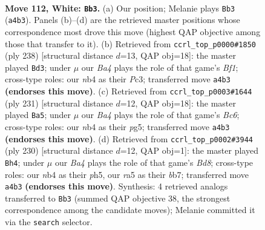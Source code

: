 \documentclass[11pt]{article}
\begin{document}
\clearpage

\begin{figure}[p]\centering
\begin{subfigure}{0.46\textwidth}\centering
\resizebox{\linewidth}{!}{%
\newchessgame
\chessboard[
  setfen={8/8/8/r4kp1/Bn6/6K1/8/8 w - - 8 112},
  showmover=false,
  pgfstyle=straightmove, color=movearrow, markmove={a4-b3}
]}
\caption{}
\end{subfigure}\hfill
\begin{subfigure}{0.46\textwidth}\centering
\resizebox{\linewidth}{!}{%
\newchessgame
\chessboard[
  setfen={8/8/3k4/2p5/8/1KP5/5r2/5B2 w - - 32 120},
  showmover=false,
  pgfstyle=straightmove, color=movearrow, markmove={f1-d3}
]}
\caption{}
\end{subfigure}
\\[4pt]
\begin{subfigure}{0.46\textwidth}\centering
\resizebox{\linewidth}{!}{%
\newchessgame
\chessboard[
  setfen={8/3k1p2/8/6P1/4K3/1Rb5/8/8 b - - 86 116},
  showmover=false,
  pgfstyle=straightmove, color=movearrow, markmove={c3-a5}
]}
\caption{}
\end{subfigure}\hfill
\begin{subfigure}{0.46\textwidth}\centering
\resizebox{\linewidth}{!}{%
\newchessgame
\chessboard[
  setfen={3B4/1b6/8/5k1p/5p2/8/5K2/8 w - - 78 116},
  showmover=false,
  pgfstyle=straightmove, color=movearrow, markmove={d8-h4}
]}
\caption{}
\end{subfigure}
\caption{\textbf{Move 112, White: \texttt{Bb3}.} (a) Our position; Melanie plays \texttt{Bb3} (\texttt{a4b3}). Panels (b)--(d) are the retrieved master positions whose correspondence most drove this move (highest QAP objective among those that transfer to it). (b) Retrieved from \texttt{ccrl\_top\_p0000\#1850} (ply 238) [structural distance $d$=13, QAP obj=18]: the master played \texttt{Bd3}; under $\mu$ our \emph{Ba4} plays the role of that game's \emph{Bf1}; cross-type roles: our \emph{n}b4 as their \emph{P}c3; transferred move \texttt{a4b3} \textbf{(endorses this move)}. (c) Retrieved from \texttt{ccrl\_top\_p0003\#1644} (ply 231) [structural distance $d$=12, QAP obj=18]: the master played \texttt{Ba5}; under $\mu$ our \emph{Ba4} plays the role of that game's \emph{Bc6}; cross-type roles: our \emph{n}b4 as their \emph{p}g5; transferred move \texttt{a4b3} \textbf{(endorses this move)}. (d) Retrieved from \texttt{ccrl\_top\_p0002\#3944} (ply 230) [structural distance $d$=12, QAP obj=1]: the master played \texttt{Bh4}; under $\mu$ our \emph{Ba4} plays the role of that game's \emph{Bd8}; cross-type roles: our \emph{n}b4 as their \emph{p}h5, our \emph{r}a5 as their \emph{b}b7; transferred move \texttt{a4b3} \textbf{(endorses this move)}. Synthesis: 4 retrieved analogs transferred to \texttt{Bb3} (summed QAP objective 38, the strongest correspondence among the candidate moves); Melanie committed it via the \texttt{search} selector.}
\label{fig:thought-m222}
\end{figure}
\end{document}
